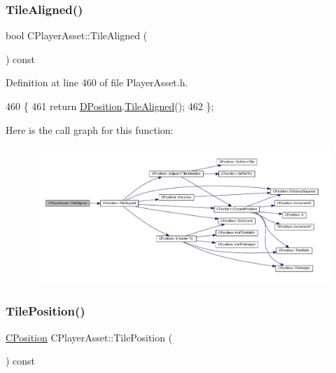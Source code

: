 \subsubsection{\texorpdfstring{Tile\+Aligned()}{TileAligned()}}
{\footnotesize\ttfamily bool C\+Player\+Asset\+::\+Tile\+Aligned (\begin{DoxyParamCaption}{ }\end{DoxyParamCaption}) const\hspace{0.3cm}{\ttfamily [inline]}}



Definition at line 460 of file Player\+Asset.\+h.


\begin{DoxyCode}
460                                 \{
461             \textcolor{keywordflow}{return} \hyperlink{classCPlayerAsset_aa9f53c009b181c7c5647c6b03776a04c}{DPosition}.\hyperlink{classCPosition_abe4ef039d9bbf51cd542167b5a0cd88e}{TileAligned}();  
462         \};
\end{DoxyCode}
Here is the call graph for this function\+:
\nopagebreak
\begin{figure}[H]
\begin{center}
\leavevmode
\includegraphics[width=350pt]{classCPlayerAsset_aaaea60176986f3e4f464bf5cec056521_cgraph}
\end{center}
\end{figure}
\hypertarget{classCPlayerAsset_a23354232e5585574bc8e12c1fdb37ad9}{}\label{classCPlayerAsset_a23354232e5585574bc8e12c1fdb37ad9} 
\subsubsection{\texorpdfstring{Tile\+Position()}{TilePosition()}\hspace{0.1cm}{\footnotesize\ttfamily [1/2]}}
{\footnotesize\ttfamily \hyperlink{classCPosition}{C\+Position} C\+Player\+Asset\+::\+Tile\+Position (\begin{DoxyParamCaption}{ }\end{DoxyParamCaption}) const\hspace{0.3cm}{\ttfamily [inline]}}



